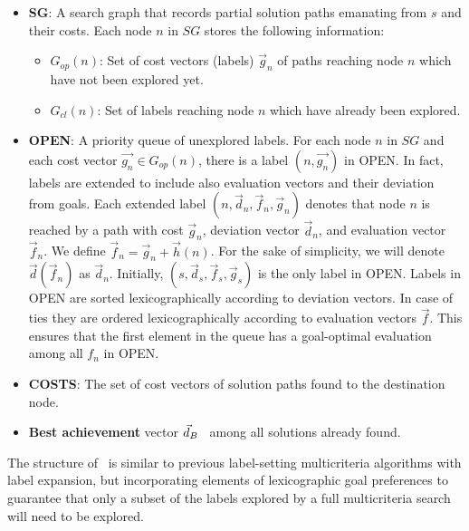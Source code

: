 \begin{itemize}
   \item \textbf{SG}: A search graph that records partial solution paths emanating from $s$ and their costs. Each node $n$ in $SG$ stores the following information:
	\begin{itemize}
   		\item $G_{op}(n)$: Set of cost vectors (labels) $\vec{g}_n$ of paths reaching node $n$ which have not been explored yet.
 		\item $G_{cl}(n)$: Set of labels reaching node $n$ which have already been explored.
	\end{itemize}

	\item \textbf{OPEN}: A priority queue of unexplored labels. For each node $n$ in $SG$ and each cost vector $\vec{g_n} \in G_{op}(n)$, there is a label $(n, \vec{g_n})$ in OPEN. In fact, labels are extended to include also evaluation vectors and their deviation from goals. Each extended label $(n, \vec{d}_n, \vec{f}_n, \vec{g}_n)$ denotes that node $n$ is reached by a path with cost $\vec{g}_n$, deviation vector $\vec{d}_n$, and evaluation vector $\vec{f}_n$. We define $\vec{f}_n = \vec{g}_n + \vec{h}(n)$.
For the sake of simplicity, we will denote $\vec{d}(\vec{f}_n)$ as $\vec{d}_n$. Initially, $(s, \vec{d}_s, \vec{f}_s, \vec{g}_s)$ is the only label in OPEN. Labels in OPEN are sorted lexicographically according to deviation vectors. In case of ties they are ordered lexicographically according to evaluation vectors $\vec f$. This ensures that the first element in the queue has a goal-optimal evaluation among all $f_n$ in OPEN.
	
	\item \textbf{COSTS}: The set of cost vectors of solution paths found to the destination node.
	
    \item \textbf{Best achievement} vector $\vec{d}_B$ \ among all solutions already found.
\end{itemize} 

The structure of \lexgo \ is similar to previous label-setting multicriteria algorithms with label expansion, but incorporating elements of lexicographic goal preferences to guarantee that only a subset of the labels explored by a full multicriteria search will need to be explored.

